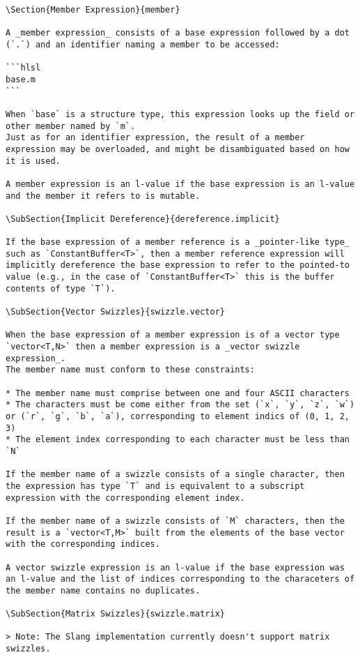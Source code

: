\begin{verbatim}
\Section{Member Expression}{member}

A _member expression_ consists of a base expression followed by a dot (`.`) and an identifier naming a member to be accessed:

```hlsl
base.m
```

When `base` is a structure type, this expression looks up the field or other member named by `m`.
Just as for an identifier expression, the result of a member expression may be overloaded, and might be disambiguated based on how it is used.

A member expression is an l-value if the base expression is an l-value and the member it refers to is mutable.

\SubSection{Implicit Dereference}{dereference.implicit}

If the base expression of a member reference is a _pointer-like type_ such as `ConstantBuffer<T>`, then a member reference expression will implicitly dereference the base expression to refer to the pointed-to value (e.g., in the case of `ConstantBuffer<T>` this is the buffer contents of type `T`).

\SubSection{Vector Swizzles}{swizzle.vector}

When the base expression of a member expression is of a vector type `vector<T,N>` then a member expression is a _vector swizzle expression_.
The member name must conform to these constraints:

* The member name must comprise between one and four ASCII characters
* The characters must be come either from the set (`x`, `y`, `z`, `w`) or (`r`, `g`, `b`, `a`), corresponding to element indics of (0, 1, 2, 3)
* The element index corresponding to each character must be less than `N`

If the member name of a swizzle consists of a single character, then the expression has type `T` and is equivalent to a subscript expression with the corresponding element index.

If the member name of a swizzle consists of `M` characters, then the result is a `vector<T,M>` built from the elements of the base vector with the corresponding indices.

A vector swizzle expression is an l-value if the base expression was an l-value and the list of indices corresponding to the characeters of the member name contains no duplicates.

\SubSection{Matrix Swizzles}{swizzle.matrix}

> Note: The Slang implementation currently doesn't support matrix swizzles.


\end{verbatim}
